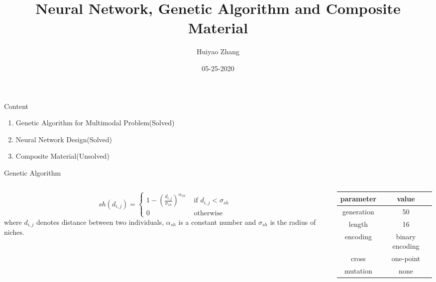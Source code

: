 \documentclass{beamer}
\title{Neural Network, Genetic Algorithm and Composite Material}
\author{Huiyao Zhang}
\institute{Kyoto Institue of Technology}
\date{05-25-2020}
\begin{document}
\begin{frame}
    \titlepage
\end{frame}



\begin{frame}[c]{Content} 
    \begin{enumerate}
        \item Genetic Algorithm for Multimodal Problem(Solved)
        \item Neural Network Design(Solved)
        \item Composite Material(Unsolved)
    \end{enumerate}
\end{frame}

\begin{frame}{Genetic Algorithm}
\begin{columns}[c]
    \begin{column}{0.6\textwidth}
   
        \begin{equation}
        s h\left(d_{i, j}\right)=\left\{\begin{array}{ll}{1-\left(\frac{d_{i, j}}{\sigma_{s h}}\right)^{\alpha_{s h}}} 
            & {\text { if } d_{i, j}<\sigma_{s h}} \\ 
        {0} & {\text { otherwise }}\end{array}\right.
        \end{equation}
        where $d_{i,j}$ denotes distance between two individuals, $\alpha_{s h}$
        is a constant number and $\sigma_{s h}$ is the radius of niches.
    \end{column}
    \begin{column}{0.4\textwidth}
        \begin{center}
        \begin{tabular}{cc}
            \toprule
            parameter & value \\
            \midrule
            generation           & 50 \\
            length      & 16 \\
            encoding& binary encoding\\
            cross& one-point \\
            mutation& none \\
            \bottomrule
        \end{tabular}
        \label{tab:GA}
        \end{center}
    \end{column}
\end{columns}



\end{frame}
\end{document}
